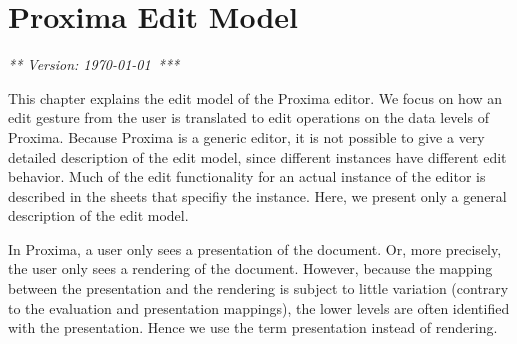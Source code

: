 \chapter{Proxima Edit Model}
\label{chap:editModel}

{\em *** Version: \today~***}



%
%











This chapter explains the edit model of the Proxima editor. We focus on how an edit gesture from the user is translated to edit operations on the data levels of Proxima.
Because Proxima is a generic editor, it is not possible to give a very detailed description of the edit model, since different instances have different edit behavior. Much of the edit functionality for an actual instance of the editor is described in the sheets that specifiy the instance. Here, we present only a general description of the edit model.

In Proxima, a user only sees a presentation of the document. Or, more precisely, the user only sees a rendering of the document. However, because the mapping between the presentation and the rendering is subject to little variation (contrary to the evaluation and presentation mappings), the lower levels are often identified with the presentation. Hence we use the term presentation instead of rendering.

